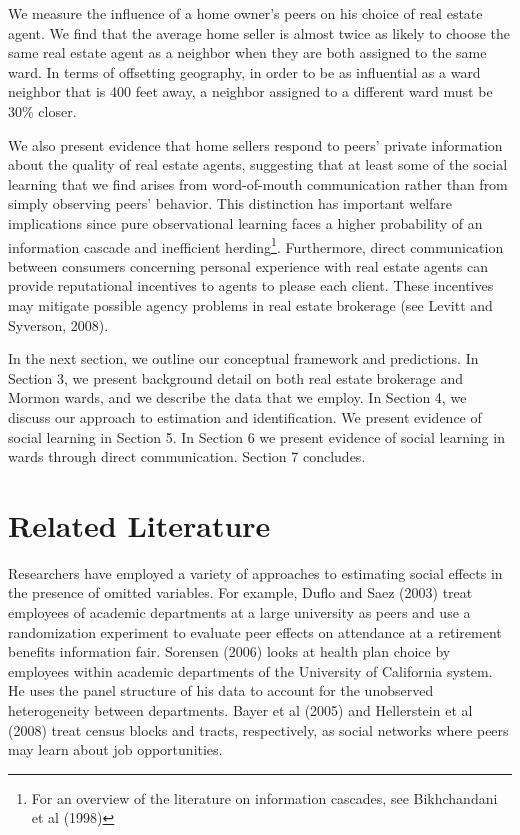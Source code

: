 \documentclass[12pt]{article}
\begin{document}
    We measure the influence of a home owner's peers on his choice of real estate agent. We find that the average home seller is almost twice as
    likely to choose the same real estate agent as a neighbor when they are both assigned to the same ward. In terms of offsetting geography, in order to be as influential as a ward neighbor that is 400 feet away, a neighbor assigned to a different ward must be 30\% closer.

    We also present evidence that home sellers respond to peers' private information about the quality of real estate agents, suggesting that at least
    some of the social learning that we find arises from word-of-mouth communication rather than from simply observing peers' behavior. This distinction has important
    welfare implications since pure observational learning faces a higher probability of an information cascade and inefficient herding\footnote{For
    an overview of the literature on information cascades, see Bikhchandani et al (1998)}. Furthermore, direct communication between consumers
    concerning personal experience with real estate agents can provide reputational incentives to agents to please each client. These incentives may
    mitigate possible agency problems in real estate brokerage (see Levitt and Syverson, 2008).

    In the next section, we outline our conceptual framework and predictions. In Section 3, we present background detail on both real estate brokerage
    and Mormon wards, and we describe the data that we employ. In Section 4, we discuss our approach to estimation and identification.  We
    present evidence of social learning in Section 5. In Section 6 we present evidence of social learning in wards through direct communication.
    Section 7 concludes.
    
\section{Related Literature}

Researchers have employed a variety of approaches to estimating social effects in the presence of omitted variables. For example, Duflo and Saez (2003) treat employees of academic departments at a large university as peers and use a randomization experiment to evaluate peer effects on attendance at a retirement benefits information fair. Sorensen (2006) looks at health plan choice by employees within academic departments of the University of California system. He uses the panel structure of his data to account for the unobserved heterogeneity between departments.
    Bayer et al (2005) and Hellerstein et al (2008) treat census blocks and tracts, respectively, as social networks where peers may learn  about job opportunities.
\end{document}
